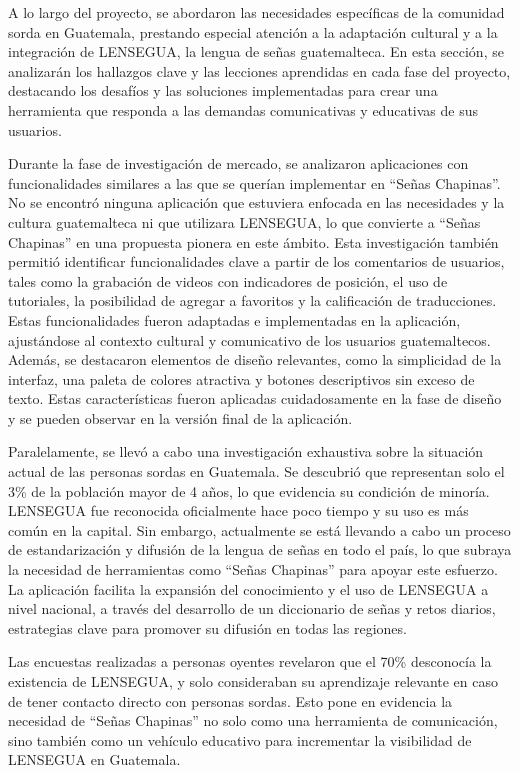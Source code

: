 A lo largo del proyecto, se abordaron las necesidades específicas de la comunidad sorda en Guatemala, prestando especial atención a la adaptación cultural y a la integración de LENSEGUA, la lengua de señas guatemalteca. En esta sección, se analizarán los hallazgos clave y las lecciones aprendidas en cada fase del proyecto, destacando los desafíos y las soluciones implementadas para crear una herramienta que responda a las demandas comunicativas y educativas de sus usuarios.

Durante la fase de investigación de mercado, se analizaron aplicaciones con funcionalidades similares a las que se querían implementar en ``Señas Chapinas''. No se encontró ninguna aplicación que estuviera enfocada en las necesidades y la cultura guatemalteca ni que utilizara LENSEGUA, lo que convierte a ``Señas Chapinas'' en una propuesta pionera en este ámbito. Esta investigación también permitió identificar funcionalidades clave a partir de los comentarios de usuarios, tales como la grabación de videos con indicadores de posición, el uso de tutoriales, la posibilidad de agregar a favoritos y la calificación de traducciones. Estas funcionalidades fueron adaptadas e implementadas en la aplicación, ajustándose al contexto cultural y comunicativo de los usuarios guatemaltecos. Además, se destacaron elementos de diseño relevantes, como la simplicidad de la interfaz, una paleta de colores atractiva y botones descriptivos sin exceso de texto. Estas características fueron aplicadas cuidadosamente en la fase de diseño y se pueden observar en la versión final de la aplicación.

Paralelamente, se llevó a cabo una investigación exhaustiva sobre la situación actual de las personas sordas en Guatemala. Se descubrió que representan solo el 3\% de la población mayor de 4 años, lo que evidencia su condición de minoría. LENSEGUA fue reconocida oficialmente hace poco tiempo y su uso es más común en la capital. Sin embargo, actualmente se está llevando a cabo un proceso de estandarización y difusión de la lengua de señas en todo el país, lo que subraya la necesidad de herramientas como ``Señas Chapinas'' para apoyar este esfuerzo. La aplicación facilita la expansión del conocimiento y el uso de LENSEGUA a nivel nacional, a través del desarrollo de un diccionario de señas y retos diarios, estrategias clave para promover su difusión en todas las regiones.

Las encuestas realizadas a personas oyentes revelaron que el 70\% desconocía la existencia de LENSEGUA, y solo consideraban su aprendizaje relevante en caso de tener contacto directo con personas sordas. Esto pone en evidencia la necesidad de ``Señas Chapinas'' no solo como una herramienta de comunicación, sino también como un vehículo educativo para incrementar la visibilidad de LENSEGUA en Guatemala.

